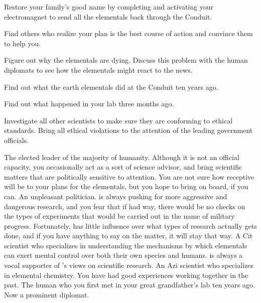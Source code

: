 \documentclass[char]{elementals}
\begin{document}
\begin{itemz}[Goals]
  \item Restore your family's good name by completing and activating your electromagnet to send all the elementals back through the Conduit.
  \item Find others who realize your plan is the best course of action and convince them to help you. %
  \item Figure out why the elementals are dying. Discuss this problem with the human diplomats to see how the elementals might react to the news.
  \item Find out what the earth elementals did at the Conduit ten years ago.
  \item Find out what happened in your lab three months ago.
  \item Investigate all other scientists to make sure they are conforming to ethical standards. Bring all ethical violations to the attention of the leading government officials.
\end{itemz}

\begin{contacts}
  \contact{\cLeader{}} The elected leader of the majority of humanity. Although it is not an official capacity, you occasionally act as a sort of science advisor, and bring scientific matters that are politically sensitive to \cLeader{\their} attention. You are not sure how receptive \cLeader{\they} will be to your plans for the elementals, but you hope to bring \cLeader{\them} on board, if you can.
	\contact{\cDema{}} An unpleasant politician. \cDema{\They} is always pushing for more aggressive and dangerous research, and you fear that if \cDema{\they} had \cDema{\their} way, there would be no checks on the types of experiments that would be carried out in the name of military progress. Fortunately, \cDema{\they} has little influence over what types of research actually gets done, and if you have anything to say on the matter, it will stay that way.
	\contact{\cMS{}} A Cit scientist who specializes in understanding the mechanisms by which elementals can exert mental control over both their own species and humans. \cMS{\They} is always a vocal supporter of \cDema{}'s views on scientific research.
	\contact{\cScientist{}} An Azi scientist who specializes in elemental chemistry. You have had good experiences working together in the past.
  \contact{\cAvatar{}} The human who you first met in your great grandfather's lab ten years ago. Now a prominent diplomat.
\end{contacts}
\end{document}
